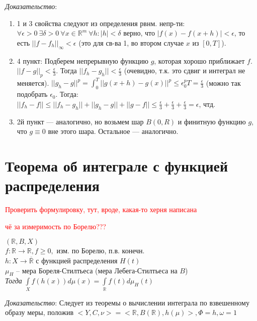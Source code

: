 \documentclass[paper=a4, fontsize=17pt]{article}
\begin{document}
\emph{Доказательство}:

\begin{enumerate}
	\item 1 и 3 свойства следуют из определения рвнм. непр-ти:
		$\forall \epsilon > 0 \ \exists \delta > 0 \  \forall x \in \mathbb{R}^m \ \forall h: |h| < \delta$ верно, что $|f(x) - f(x+h)| < \epsilon$, то есть $||f-f_h||_\infty < \epsilon$
		(это для св-ва 1, во втором случае $x$ из $[0,T]$).
	\item 4 пункт: Подберем непрерывную функцию $g$, которая хорошо приближает $f$. $||f - g||_p < \frac{\epsilon}{3}$. Тогда $||f_h - g_h|| < \frac{\epsilon}{3}$ (очевидно, т.к. это сдвиг и интеграл не меняется). $||g_h-g||^p = \int_{0}^{T} ||g(x+h) - g(x)||^p \leq \epsilon_0^p T = \frac{\epsilon}{3}$ (можно так подобрать $\epsilon_0$. Тогда:  $||f_h - f|| \leq ||f_h-g_h|| + ||g_h - g|| + ||g - f|| \leq \frac{\epsilon}{3} + \frac{\epsilon}{3} + \frac{\epsilon}{3} = \epsilon$, чтд.
	\item 2й пункт --- аналогично, но возьмем шар $B(0, R)$ и финитную функцию $g$, что $g \equiv 0$ вне этого шара. Остальное --- аналогично. 
\end{enumerate}

\section{Теорема об интеграле с функцией распределения}
\textcolor{red}{Проверить формулировку, тут, вроде, какая-то херня написана}

\textcolor{red}{чё за измеримость по Борелю???}

$(\mathbb{R}, B, X)$ \\
$f:\mathbb{R}\rightarrow\mathbb{R}, f \ge 0,$ изм. по Борелю, п.в. конечн.\\
$h: X \rightarrow \overline{\mathbb{R}}$ с функцией распределения $H(t)$\\

$\mu_H$ -- мера Бореля-Стилтьеса (мера Лебега-Стилтьеса на $B$)\\

\emph{Тогда} $\int\limits_X f(h(x))d\mu(x) = \int\limits_{\mathbb{R}}f(t)d\mu_{H}(t)$

\emph{Доказательство}:
Следует из теоремы о вычислении интеграла по взвешенному образу меры, положив $<Y, C, \nu> = <\mathbb{R}, B(\mathbb{R}), h(\mu)>, \Phi = h, \omega = 1$
\end{document}
